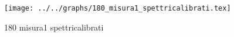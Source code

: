 \begin{figure}[h] \centering\texttt{[image: ../../graphs/180\_misura1\_spettricalibrati.tex]}\caption{180 misura1 spettricalibrati}\label{gr:180_misura1_spettricalibrati} \end{figure}
